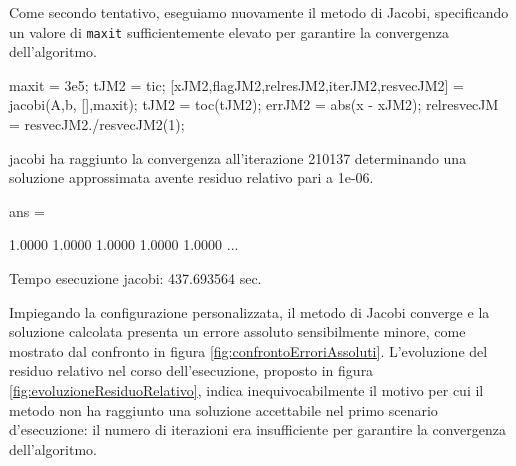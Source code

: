     Come secondo tentativo, eseguiamo nuovamente il metodo di Jacobi, specificando un valore di \lstinline{maxit} sufficientemente elevato per garantire la
    convergenza dell'algoritmo.
    \begin{matlabcode}
        maxit = 3e5;
        tJM2 = tic;
        [xJM2,flagJM2,relresJM2,iterJM2,resvecJM2] = jacobi(A,b,
        [],maxit);
        tJM2 = toc(tJM2);
        errJM2 = abs(x - xJM2);
        relresvecJM = resvecJM2./resvecJM2(1);
    \end{matlabcode}
    \begin{matlaboutput}
        jacobi ha raggiunto la convergenza all'iterazione 210137
        determinando una soluzione approssimata avente residuo
        relativo pari a 1e-06.

        ans =

        1.0000    1.0000    1.0000    1.0000    1.0000    ...
    \end{matlaboutput}
    \begin{matlaboutput}
        Tempo esecuzione jacobi: 437.693564 sec.
    \end{matlaboutput}
    Impiegando la configurazione personalizzata, il metodo di Jacobi converge e la soluzione calcolata presenta un errore assoluto sensibilmente minore, come
    mostrato dal confronto in figura \ref{fig:confrontoErroriAssoluti}.\newline
    L'evoluzione del residuo relativo nel corso dell'esecuzione, proposto in figura \ref{fig:evoluzioneResiduoRelativo}, indica inequivocabilmente il motivo per cui il metodo non ha raggiunto
    una soluzione accettabile nel primo scenario d'esecuzione: il numero di iterazioni era insufficiente per garantire la convergenza dell'algoritmo.

